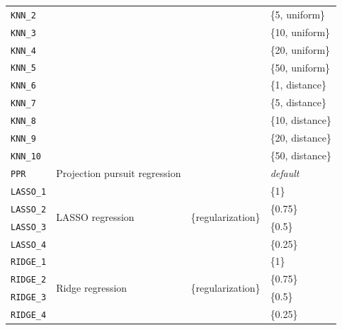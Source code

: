 \documentclass[smallcondensed]{svjour3}
\begin{document}
\begin{table}[!bth]
{\begin{tabular}{llll}
	    \texttt{KNN\_2} & & & \{5, uniform\} \\
	    
	    \texttt{KNN\_3} & & & \{10, uniform\} \\
	    
	    \texttt{KNN\_4} & & & \{20, uniform\} \\
	    
	    \texttt{KNN\_5} & & & \{50, uniform\} \\
	    
	    \texttt{KNN\_6} & & & \{1, distance\} \\
	    
	    \texttt{KNN\_7} & & & \{5, distance\} \\
	    
	    \texttt{KNN\_8} & & & \{10, distance\} \\
	    
	    \texttt{KNN\_9} & & & \{20, distance\} \\
	    
	    \texttt{KNN\_10} & & & \{50, distance\} \\
	    
	    \midrule   
	    
	    \texttt{PPR} & Projection pursuit regression &   & \textit{default} \\
        
	    \midrule 
	    
	    \texttt{LASSO\_1} & \multirow{4}{*}{LASSO regression} & \multirow{4}{*}{\{regularization\}} & \{1\}\\
	    
	    \texttt{LASSO\_2} & & & \{0.75\}\\
	    
	    \texttt{LASSO\_3} & & & \{0.5\}\\
	    
	    \texttt{LASSO\_4} & & & \{0.25\}\\
	    
	    \midrule 
	    
	    \texttt{RIDGE\_1} & \multirow{4}{*}{Ridge regression} & \multirow{4}{*}{\{regularization\}} & \{1\}\\
	    
	    \texttt{RIDGE\_2} & & & \{0.75\}\\
	    
	    \texttt{RIDGE\_3} & & & \{0.5\}\\
	    
	    \texttt{RIDGE\_4} & & & \{0.25\}\\
	    

\end{tabular}}
\end{table}
\end{document}
